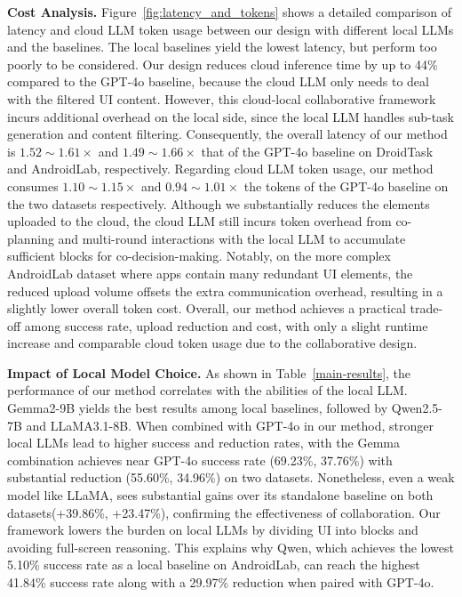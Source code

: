 \textbf{Cost Analysis.}
Figure~\ref{fig:latency_and_tokens} shows a detailed comparison of latency and cloud LLM token usage between our design with different local LLMs and the baselines. The local baselines yield the lowest latency, but perform too poorly to be considered. Our design reduces cloud inference time by up to 44\% compared to the GPT-4o baseline, because the cloud LLM only needs to deal with the filtered UI content. However, this cloud-local collaborative framework incurs additional overhead on the local side, since the local LLM handles sub-task generation and content filtering. Consequently, the overall latency of our method is \(1.52{\sim}1.61\times\) and \(1.49{\sim}1.66\times\) that of the GPT-4o baseline on DroidTask and AndroidLab, respectively. Regarding cloud LLM token usage, our method consumes \(1.10{\sim}1.15\times\) and \(0.94{\sim}1.01\times\) the tokens of the GPT-4o baseline on the two datasets respectively. Although we substantially reduces the elements uploaded to the cloud, the cloud LLM still incurs token overhead from co-planning and multi-round interactions with the local LLM to accumulate sufficient blocks for co-decision-making. Notably, on the more complex AndroidLab dataset where apps contain many redundant UI elements, the reduced upload volume offsets the extra communication overhead, resulting in a slightly lower overall token cost. Overall, our method achieves a practical trade-off among success rate, upload reduction and cost, with only a slight runtime increase and comparable cloud token usage due to the collaborative design.

\textbf{Impact of Local Model Choice.}
As shown in Table~\ref{main-results}, the performance of our method correlates with the abilities of the local LLM. Gemma2-9B yields the best results among local baselines, followed by Qwen2.5-7B and LLaMA3.1-8B. When combined with GPT-4o in our method, stronger local LLMs lead to higher success and reduction rates, with the Gemma combination achieves near GPT-4o success rate (69.23\%, 37.76\%) with substantial reduction (55.60\%, 34.96\%) on two datasets. Nonetheless, even a weak model like LLaMA, sees substantial gains over its standalone baseline on both datasets(+39.86\%, +23.47\%), confirming the effectiveness of collaboration. Our framework lowers the burden on local LLMs by dividing UI into blocks and avoiding full-screen reasoning. This explains why Qwen, which achieves the lowest 5.10\% success rate as a local baseline on AndroidLab, can reach the highest 41.84\% success rate along with a 29.97\% reduction when paired with GPT-4o.

